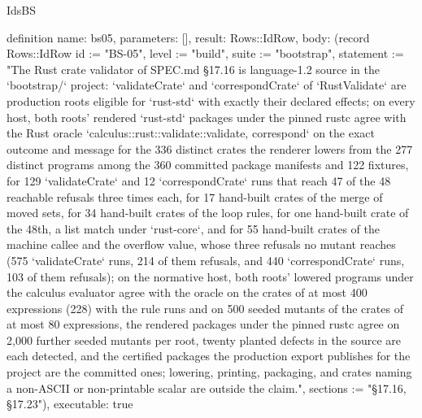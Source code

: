 \begin{lexlean}{IdsBS}
\begin{semanticmodule}
definition{
  name: bs05,
  parameters: [],
  result: Rows::IdRow,
  body: (record Rows::IdRow {id := "BS-05", level := "build", suite := "bootstrap", statement := "The Rust crate validator of SPEC.md §17.16 is language-1.2 source in the `bootstrap/` project: `validateCrate` and `correspondCrate` of `RustValidate` are production roots eligible for `rust-std` with exactly their declared effects; on every host, both roots' rendered `rust-std` packages under the pinned rustc agree with the Rust oracle `calculus::rust::validate::{validate, correspond}` on the exact outcome and message for the 336 distinct crates the renderer lowers from the 277 distinct programs among the 360 committed package manifests and 122 fixtures, for 129 `validateCrate` and 12 `correspondCrate` runs that reach 47 of the 48 reachable refusals three times each, for 17 hand-built crates of the merge of moved sets, for 34 hand-built crates of the loop rules, for one hand-built crate of the 48th, a list match under `rust-core`, and for 55 hand-built crates of the machine callee and the overflow value, whose three refusals no mutant reaches (575 `validateCrate` runs, 214 of them refusals, and 440 `correspondCrate` runs, 103 of them refusals); on the normative host, both roots' lowered programs under the calculus evaluator agree with the oracle on the crates of at most 400 expressions (228) with the rule runs and on 500 seeded mutants of the crates of at most 80 expressions, the rendered packages under the pinned rustc agree on 2,000 further seeded mutants per root, twenty planted defects in the source are each detected, and the certified packages the production export publishes for the project are the committed ones; lowering, printing, packaging, and crates naming a non-ASCII or non-printable scalar are outside the claim.", sections := "§17.16, §17.23"}),
  executable: true
}


\end{semanticmodule}
\end{lexlean}
